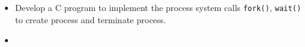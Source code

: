 \documentclass{article}
\newcommand{\question}[2]{
	\item [#1.] #2
}
\newcommand{\ttt}[1]{\texttt{#1}}
\newcommand{\answer}[1]{\item [$\rightarrow$] \inputminted{c}{#1}}
\begin{document}
	\begin{itemize}
		\question{1}{
			Develop a C program to implement the process system calls \ttt{fork()}, \ttt{wait()} to create process and terminate process.
		}

		\answer{lab1.c}
	\end{itemize}
\end{document}
